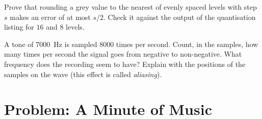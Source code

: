 \begin{exercise}[$\star\star\star$]\label{exo:g10:images-sound-compression:14}
Prove that rounding a grey value to the nearest of evenly spaced levels with step $s$ makes an error of at most
$s/2$. Check it against the output of the quantisation listing for $16$ and $8$ levels.
\end{exercise}

\begin{exercise}[$\star\star\star$]\label{exo:g10:images-sound-compression:15}
A tone of $7000$~Hz is sampled $8000$ times per second. Count, in the samples, how many times per second the signal
goes from negative to non-negative. What frequency does the recording seem to have? Explain with the positions of the
samples on the wave (this effect is called \emph{aliasing}).
\end{exercise}

\section{Problem: A Minute of Music}\label{sec:g10:images-sound-compression:problem}

